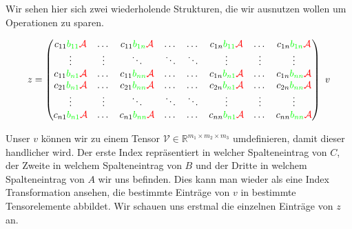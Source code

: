 Wir sehen hier sich zwei wiederholende Strukturen, die wir ausnutzen wollen um Operationen zu sparen.

\begin{equation} \label{eq:matrix} z=
\begin{pmatrix}
c_{11} \textcolor{green}{b_{11}} \textcolor{red}{\mathcal{A}} & \dots  & c_{11} \textcolor{green}{b_{1n}} \textcolor{red}{\mathcal{A}} & \dots & \dots & c_{1n}\textcolor{green}{b_{11}}\textcolor{red}{\mathcal{A}} & \dots & c_{1n}\textcolor{green}{b_{1n}}\textcolor{red}{\mathcal{A}}  \\

\vdots & \vdots & \ddots & \ddots  & \ddots & \vdots & \vdots & \vdots \\
c_{11} \textcolor{green}{b_{n1}} \textcolor{red}{\mathcal{A}} & \dots  & c_{11} \textcolor{green}{b_{nn}} \textcolor{red}{\mathcal{A}} & \dots & \dots & c_{1n}\textcolor{green}{b_{n1}}\textcolor{red}{\mathcal{A}} & \dots & c_{1n}\textcolor{green}{b_{nn}}\textcolor{red}{\mathcal{A}}  \\
c_{21} \textcolor{green}{b_{n1}} \textcolor{red}{\mathcal{A}} & \dots  & c_{21} \textcolor{green}{b_{nn}} \textcolor{red}{\mathcal{A}} & \dots & \dots & c_{2n}\textcolor{green}{b_{n1}}\textcolor{red}{\mathcal{A}} & \dots & c_{2n}\textcolor{green}{b_{nn}}\textcolor{red}{\mathcal{A}}  \\
\vdots & \vdots & \ddots & \ddots  & \ddots & \vdots & \vdots & \vdots \\
c_{n1} \textcolor{green}{b_{n1}} \textcolor{red}{\mathcal{A}} & \dots  & c_{n1} \textcolor{green}{b_{nn}} \textcolor{red}{\mathcal{A}} & \dots & \dots & c_{nn}\textcolor{green}{b_{n1}}\textcolor{red}{\mathcal{A}} & \dots & c_{nn}\textcolor{green}{b_{nn}}\textcolor{red}{\mathcal{A}}  \\
\end{pmatrix} \, \, v
\end{equation}


Unser $v$ können wir zu einem Tensor $\mathcal{V} \in \mathbb{R}^{m_1 \times m_2 \times m_3} $ umdefinieren, damit dieser handlicher wird. Der erste Index repräsentiert in welcher Spalteneintrag von $C$, der Zweite in welchem Spalteneintrag von $B$ und der Dritte in welchem Spalteneintrag von $A$ wir uns befinden. Dies kann man wieder als eine Index Transformation ansehen, die bestimmte Einträge von $v$ in bestimmte Tensorelemente abbildet. 
Wir schauen uns erstmal die einzelnen Einträge von $z$ an. 

